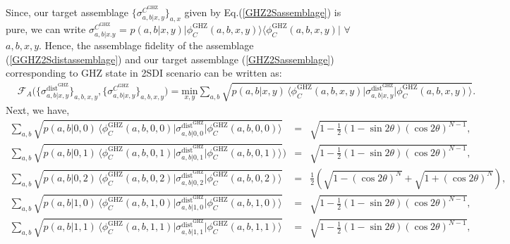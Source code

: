 \documentclass[reprint,superscriptaddress,nofootinbib,amsmath,amssymb,aps,pra,longbibliography]{revtex4-1}
\begin{document}
\begin{widetext}
 Since, our target assemblage $\{\sigma_{a,b|x,y}^{C^{\text{GHZ}}} \}_{a,x}$ given by  Eq.(\ref{GHZ2Sassemblage}) is pure, we can write $\sigma_{a,b|x.y}^{C^{\text{GHZ}}}$ = $p(a,b|x,y) \Big| \phi_{C}^{\text{GHZ}} (a,b, x,y) \Big\rangle \Big\langle \phi_{C}^{\text{GHZ}} (a,b, x,y) \Big|$ $\forall$ $a,b,x,y$. Hence, the assemblage fidelity of the assemblage (\ref{GGHZ2Sdistassemblage}) and our target assemblage (\ref{GHZ2Sassemblage}) corresponding to GHZ state in 2SDI scenario can be written as: 
\begin{align}
    &\mathcal{F}_A \Big(\{\sigma_{a,b|x,y}^{\text{dist}^{\text{GHZ}}}\}_{a,b,x,y}, \{\sigma_{a,b|x,y}^{C^{\text{GHZ}}}\}_{a,b,x,y} \Big) = \underset{x,y}{\mathrm{min}} \sum_{a,b} \sqrt{p(a,b|x,y) \, \Big\langle \phi_{C}^{\text{GHZ}} (a,b, x,y) \Big| \sigma_{a,b|x,y}^{\text{dist}^{\text{GHZ}}} \Big| \phi_{C}^{\text{GHZ}} (a,b, x,y) \Big\rangle}.
     \label{assfidghz1app2sdi}
\end{align}
Next, we have,
\begin{eqnarray}
	\sum_{a,b} \sqrt{p(a,b|0,0) \, \Big\langle \phi_{C}^{\text{GHZ}} (a,b, 0,0) \Big| \sigma_{a,b|0,0}^{\text{dist}^{\text{GHZ}}} \Big| \phi_{C}^{\text{GHZ}} (a,b, 0,0) \Big\rangle} &=&  \sqrt{1 - \frac{1}{2} (1 - \sin 2 \theta ) (\cos 2 \theta )^{N-1}}, \label{AF2SG36} \\
	\sum_{a,b} \sqrt{p(a,b|0,1) \, \Big\langle \phi_{C}^{\text{GHZ}} (a,b, 0,1) \Big| \sigma_{a,b|0,1}^{\text{dist}^{\text{GHZ}}} \Big| \phi_{C}^{\text{GHZ}} (a,b, 0,1) \Big\rangle}) &=& \sqrt{1 - \frac{1}{2} (1 - \sin 2 \theta ) (\cos 2 \theta )^{N-1}}, \label{AF2SG37} \\
	\sum_{a,b} \sqrt{p(a,b|0,2) \, \Big\langle \phi_{C}^{\text{GHZ}} (a,b, 0,2) \Big| \sigma_{a,b|0,2}^{\text{dist}^{\text{GHZ}}} \Big| \phi_{C}^{\text{GHZ}} (a,b, 0,2) \Big\rangle} &=& \frac{1}{2} \left(\sqrt{1- (\cos 2 \theta )^N}+\sqrt{ 1+ (\cos 2 \theta )^N }\right), \label{AF2SG38} \\
	\sum_{a,b} \sqrt{p(a,b|1,0) \, \Big\langle \phi_{C}^{\text{GHZ}} (a,b, 1,0) \Big| \sigma_{a,b|1,0}^{\text{dist}^{\text{GHZ}}} \Big| \phi_{C}^{\text{GHZ}} (a,b, 1,0) \Big\rangle} &=& \sqrt{1 - \frac{1}{2} (1 - \sin 2 \theta ) (\cos 2 \theta )^{N-1}}, \label{AF2SG39} \\
	\sum_{a,b} \sqrt{p(a,b|1,1) \, \Big\langle \phi_{C}^{\text{GHZ}} (a,b, 1,1) \Big| \sigma_{a,b|1,1}^{\text{dist}^{\text{GHZ}}} \Big| \phi_{C}^{\text{GHZ}} (a,b, 1,1) \Big\rangle} &=& \sqrt{1 - \frac{1}{2} (1 - \sin 2 \theta ) (\cos 2 \theta )^{N-1}},  \label{AF2SG40}\\

\end{eqnarray}
\end{widetext}
\end{document}
